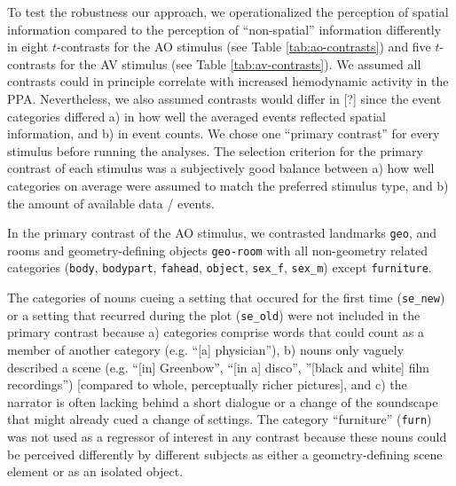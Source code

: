 \documentclass[english]{article}
\begin{document}
To test the robustness our approach, we operationalized the perception of
spatial information compared to the perception of ``non-spatial'' information
differently in eight $t$-contrasts for the AO stimulus (see Table
\ref{tab:ao-contrasts}) and five $t$-contrasts for the AV stimulus (see Table
\ref{tab:av-contrasts}).
We assumed all contrasts could in principle correlate with increased hemodynamic
activity in the PPA.
Nevertheless, we also assumed contrasts would differ in [?]  since the event categories differed a) in how well the
averaged events reflected spatial information, and b) in event counts.
We chose one ``primary contrast'' for every stimulus before running the
analyses.
The selection criterion for the primary contrast of each stimulus was a
subjectively good balance between a) how well categories on average were assumed
to match the preferred stimulus type, and b) the amount of available data /
events.

In the primary contrast of the AO stimulus, we contrasted landmarks
\texttt{geo}, and rooms and geometry-defining objects \texttt{geo-room} with all non-geometry related categories (\texttt{body},
\texttt{bodypart}, \texttt{fahead}, \texttt{object}, \texttt{sex\_f},
\texttt{sex\_m}) except \texttt{furniture}.

The categories of nouns cueing a setting that occured for the first time
(\texttt{se\_new}) or a setting that recurred during the plot (\texttt{se\_old})
were not included in the primary contrast because
a) categories comprise words that could count as a member of another category
(e.g. ``[a] physician''),
b) nouns only vaguely described a scene (e.g. ``[in] Greenbow'', ``[in a]
disco'', ''[black and white] film recordings'') [compared to whole, perceptually
richer pictures], and
c) the narrator is often lacking behind a short dialogue or a change of the
soundscape that might already cued a change of settings.
The category ``furniture'' (\texttt{furn}) was not used as a regressor of
interest in any contrast because these nouns could be perceived differently by
different subjects as either a geometry-defining scene element or as an isolated
object.
\end{document}
